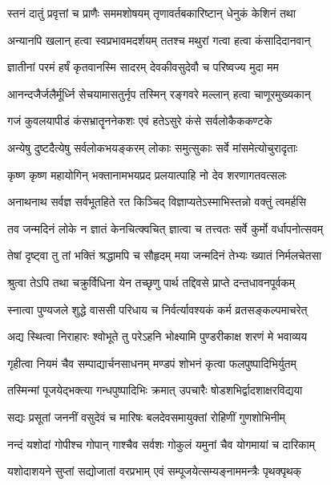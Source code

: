 \twolineshloka
{स्तनं दातुं प्रवृत्तां च प्राणैः सममशोषयम्}
{तृणावर्तबकारिष्टान् धेनुकं केशिनं तथा}%

\twolineshloka
{अन्यानपि खलान् हत्वा स्वप्रभावमदर्शयम्}
{ततश्च मथुरां गत्वा हत्वा कंसादिदानवान्}%

\twolineshloka
{ज्ञातीनां परमं हर्षं कृतवानस्मि सादरम्}
{देवकीवसुदेवौ च परिष्वज्य मुदा मम}%

\twolineshloka
{आनन्दजैर्जलैर्मूर्ध्नि सेचयामासतुर्नृप}
{तस्मिन् रङ्गवरे मल्लान् हत्वा चाणूरमुख्यकान्}%

\twolineshloka
{गजं कुवलयापीडं कंसभ्रातॄननेकशः}
{एवं हतेऽसुरे कंसे सर्वलोकैककण्टके}%

\twolineshloka
{अन्येषु दुष्टदैत्येषु सर्वलोकभयङ्करम्}
{लोकाः समुत्सुकाः सर्वे मांसमेत्योचुरादृताः}%

\twolineshloka
{कृष्ण कृष्ण महायोगिन् भक्तानामभयप्रद}
{प्रलयात्पाहि नो देव शरणागतवत्सलः}%

\twolineshloka
{अनाथनाथ सर्वज्ञ सर्वभूतहिते रत}
{किञ्चिद् विज्ञाप्यतेऽस्माभिस्तन्नो वक्तुं त्वमर्हसि}%

\twolineshloka
{तव जन्मदिनं लोके न ज्ञातं केनचित्क्वचित्}
{ज्ञात्वा च तत्त्वतः सर्वे कुर्मो वर्धापनोत्सवम्}%

\twolineshloka
{तेषां दृष्ट्वा तु तां भक्तिं श्रद्धामपि च सौहृदम्}
{मया जन्मदिनं तेभ्यः ख्यातं निर्मलचेतसा}%

\twolineshloka
{श्रुत्वा तेऽपि तथा चक्रुर्विधिना येन तच्छृणु}
{पार्थ तद्दिवसे प्राप्ते दन्तधावनपूर्वकम्}%

\twolineshloka
{स्नात्वा पुण्यजले शुद्धे वाससी परिधाय च}
{निर्वर्त्यावश्यकं कर्म व्रतसङ्कल्पमाचरेत्}%

\twolineshloka
{अद्य स्थित्वा निराहारः श्वोभूते तु परेऽहनि}
{भोक्ष्यामि पुण्डरीकाक्ष शरणं मे भवाव्यय}%

\twolineshloka
{गृहीत्वा नियमं चैव सम्पाद्यार्चनसाधनम्}
{मण्डपं शोभनं कृत्वा फलपुष्पादिभिर्युतम्}%

\twolineshloka
{तस्मिन्मां पूजयेद्भक्त्या गन्धपुष्पादिभिः क्रमात्}
{उपचारैः षोडशभिर्द्वादशाक्षरविद्यया}%

\twolineshloka
{सद्यः प्रसूतां जननीं वसुदेवं च मारिषः}
{बलदेवसमायुक्तां रोहिणीं गुणशोभिनीम्}%

\twolineshloka
{नन्दं यशोदां गोपीश्च गोपान् गाश्चैव सर्वशः}
{गोकुलं यमुनां चैव योगमायां च दारिकाम्}%

\twolineshloka
{यशोदाशयने सुप्तां सद्योजातां वरप्रभाम्}
{एवं सम्पूजयेत्सम्यङ्नाममन्त्रैः पृथक्पृथक्}%


